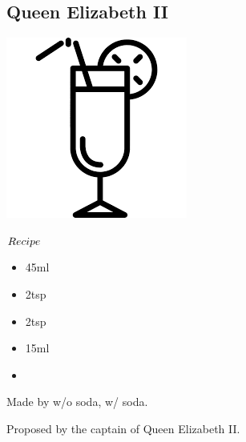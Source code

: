 \subsection{Queen Elizabeth II}
\vspace{-7.6mm}
\hspace{53mm}
\includegraphics[scale=.07]{cocktail_glass_tall.png}
\vspace{2.5mm}
\begin{itembox}[l]{\boldmath $Recipe$}
\begin{itemize}
\setlength{\parskip}{0cm}
\setlength{\itemsep}{0cm}
\item \gin 45ml
\item \campari 2tsp
\item \gs 2tsp
\item \oj 15ml
\item \soda
\end{itemize}
\vspace{-4mm}
Made by \shake w/o soda, \build w/ soda.
\end{itembox}
Proposed by the captain of Queen Elizabeth II.
